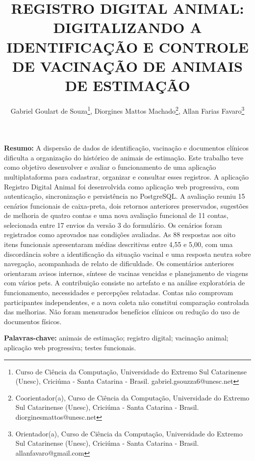 \documentclass{UNESC}
\title{REGISTRO DIGITAL ANIMAL: DIGITALIZANDO A IDENTIFICAÇÃO E CONTROLE DE VACINAÇÃO DE ANIMAIS DE ESTIMAÇÃO}
\author
{
   Gabriel Goulart de Souza\footnote{Curso de Ciência da Computação, Universidade do Extremo Sul Catarinense (Unesc), Criciúma - Santa Catarina - Brasil. gabriel.gsouzza6@unesc.net},
   Diorgines Mattos Machado\footnote{Coorientador(a), Curso de Ciência da Computação, Universidade do Extremo Sul Catarinense (Unesc), Criciúma - Santa Catarina - Brasil. diorginesmattos@unesc.net},
   Allan Farias Favaro\footnote{Orientador(a), Curso de Ciência da Computação, Universidade do Extremo Sul Catarinense (Unesc), Criciúma - Santa Catarina - Brasil. allanfavaro@gmail.com}
}
\begin{document}
\onehalfspacing

\maketitle

\noindent
\textbf{Resumo:} A dispersão de dados de identificação, vacinação e documentos clínicos dificulta a organização do histórico de animais de estimação. Este trabalho teve como objetivo desenvolver e avaliar o funcionamento de uma aplicação multiplataforma para cadastrar, organizar e consultar esses registros. A aplicação Registro Digital Animal foi desenvolvida como aplicação web progressiva, com autenticação, sincronização e persistência no PostgreSQL. A avaliação reuniu 15 cenários funcionais de caixa-preta, dois retornos anteriores preservados, sugestões de melhoria de quatro contas e uma nova avaliação funcional de 11 contas, selecionada entre 17 envios da versão 3 do formulário. Os cenários foram registrados como aprovados nas condições avaliadas. As 88 respostas aos oito itens funcionais apresentaram médias descritivas entre 4,55 e 5,00, com uma discordância sobre a identificação da situação vacinal e uma resposta neutra sobre navegação, acompanhada de relato de dificuldade. Os comentários anteriores orientaram avisos internos, síntese de vacinas vencidas e planejamento de viagens com vários pets. A contribuição consiste no artefato e na análise exploratória de funcionamento, necessidades e percepções relatadas. Contas não comprovam participantes independentes, e a nova coleta não constitui comparação controlada das melhorias. Não foram mensurados benefícios clínicos ou redução do uso de documentos físicos.

\vspace{0.5em}
\noindent
\textbf{Palavras-chave:} animais de estimação; registro digital; vacinação animal; aplicação web progressiva; testes funcionais.
\end{document}
